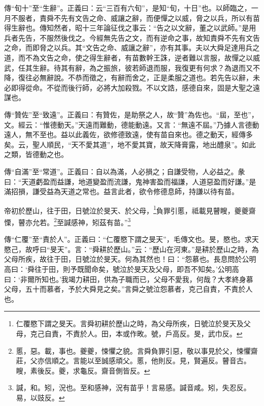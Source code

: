 {\noindent\zhuan{}\fzbyks 傳“旬十”至“生辭”。正義曰：云“三百有六旬”，是知“旬，十日”也。以師臨之，一月不服者，責舜不先有文告之命、威讓之辭，而便憚之以威，脅之以兵，所以有苗得生辭也。傳知然者，昭十三年論征伐之事云：“告之以文辭，董之以武師。”是用兵者先告，不服然後伐之。今經無先告之文，而有逆命之事，故知責舜不先有文告之命，而即脅之以兵。其“文告之命、威讓之辭”，亦有其事。夫以大舜足達用兵之道，而不為文告之命，使之得生辭者，有苗數幹王誅，逆者難以言服，故憚之以威武，任其生辭。待其有辭，為之振旅，彼若師退而服，我復更有何求？為退而又不降，復往必無辭說。不恭而徵之，有辭而舍之，正是柔服之道也。若先告以辭，未必即得從命。不從而後行師，必將大加殺戮。不以文誥，感德自來，固是大聖之遠謀也。 \par}

{\noindent\zhuan{}\fzbyks 傳“贊佐”至“致遠”。正義曰：有贊佐，是助祭之人，故“贊”為佐也。“屆，至也”，文。經云：“惟德動天。”天遠而難動，德能動遠。又言：“無遠不屆。”乃據人言德動遠人，無不至也。益以此義佐，欲修德致遠，使有苗自來也。德之動天，經傳多矣。云，聖人順民，“天不愛其道”，地不愛其寶，故天降膏露，地出醴泉”。如此之類，皆德動之也。 \par}

{\noindent\zhuan{}\fzbyks 傳“自滿”至“常道”。正義曰：自以為滿，人必損之；自謙受物，人必益之。彖曰：“天道虧盈而益謙，地道變盈而流謙，鬼神害盈而福謙，人道惡盈而好謙。”是滿招損，謙受益為天道之常也。益言此者，欲令修德息師，持謙以待有苗。 \par}

帝初於歷山，往于田，日號泣於旻天、於父母，\footnote{仁覆愍下謂之旻天。言舜初耕於歷山之時，為父母所疾，日號泣於旻天及父母，克己自責，不責於人。田，本或作畋。號，戶高反。旻，武巾反。}負罪引慝，祗載見瞽瞍，夔夔齋慄，瞽亦允若。\footnote{慝，惡。載，事也。夔夔，悚懼之貌。言舜負罪引惡，敬以事見於父，悚懼齋莊，父亦信順之。言能以至誠感頑父。慝，他則反。見，賢遍反。瞽音古。瞍，素後反。夔，求龜反。齋音側皆反。}至諴感神，矧茲有苗。”\footnote{諴，和。矧，況也。至和感神，況有苗乎！言易感。諴音咸。矧，失忍反。易，以豉反。}

{\noindent\zhuan{}\fzbyks 傳“仁覆”至“責於人”。正義曰：“仁覆愍下謂之旻天”，毛傳文也。旻，愍也。求天愍己，故呼曰“旻天”。言：“舜耕於歷山。”云：“歷山在河東。”是耕於歷山之時，為父母所疾，故往于田，日號泣於旻天。何為其然也！曰：“怨慕也。長息問於公明高曰：‘舜往于田，則予既聞命矣，號泣於旻天及父母，即吾不知矣。’公明高曰：‘非爾所知也。’我竭力耕田，供為子職而已，父母不愛我，何哉？大孝終身慕父母，五十而慕者，予於大舜見之矣。”言舜之號泣怨慕者，克己自責，不責於人也。 \par}

